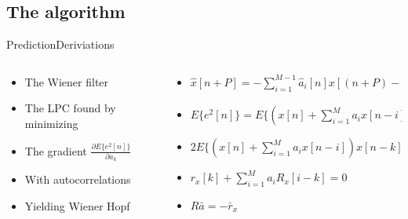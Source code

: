 \subsection{The algorithm}
\begin{frame}{Prediction}{Deriviations}
	\begin{columns}
		\begin{column}{0.45\textwidth}
			\begin{itemize}
				\item The Wiener filter 
				\vspace{3mm}
				\item The LPC found by minimizing 
				\vspace{3mm}
				\item The gradient $\frac{\partial E\{e^2[n]\}}{\partial a_k}$
				\vspace{3mm}
				\item With autocorrelations
				\vspace{3mm}
				\item Yielding Wiener Hopf				
			\end{itemize}
		\end{column}
		\begin{column}{0.55\textwidth} 
			\begin{itemize}
				\item[] $\hat{x}[n+P] =- \sum^{M-1}_{i=1}\hat{a}_i[n]x[(n+P)-i]$
				\vspace{3mm}
				\item[] $E\{e^2[n]\}=E\{(x[n]+\sum_{i=1}^{M}a_ix[n-i] )^2\}$
				\vspace{3mm}
				\item[] $2E\{(x[n]+\sum_{i=1}^{M}a_ix[n-i] )x[n-k]\}=0$
				\vspace{3mm}
				\item[] $r_x[k]+\sum_{i=1}^{M}a_iR_x[i-k]=0$
				\vspace{3mm}
				\item[] $R  \bar{a} = -\bar{r}_x$
			\end{itemize}		
		\end{column}
	\end{columns}
\end{frame}

